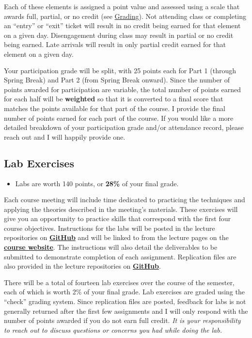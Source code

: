 \documentclass[
]{book}
\newenvironment{rmdblock}[1]
  {\begin{shaded*}
  \begin{itemize}
  \renewcommand{\labelitemi}{
    \raisebox{-.7\height}[0pt][0pt]{
      {\setkeys{Gin}{width=3em,keepaspectratio}\texttt{[image: images/\#1]}}
    }
  }
  \item
  }
  {
  \end{itemize}
  \end{shaded*}
  }
\newenvironment{rmdtip}
  {\begin{rmdblock}{tip}}
  {\end{rmdblock}}
\begin{document}
Each of these elements is assigned a point value and assessed using a scale that awards full, partial, or no credit (see \href{grading.html}{Grading}). Not attending class or completing an ``entry'' or ``exit'' ticket will result in no credit being earned for that element on a given day. Disengagement during class may result in partial or no credit being earned. Late arrivals will result in only partial credit earned for that element on a given day.

Your participation grade will be split, with 25 points each for Part 1 (through Spring Break) and Part 2 (from Spring Break onward). Since the number of points awarded for participation are variable, the total number of points earned for each half will be \textbf{weighted} so that it is converted to a final score that matches the points available for that part of the course. I provide the final number of points earned for each part of the course. If you would like a more detailed breakdown of your participation grade and/or attendance record, please reach out and I will happily provide one.

\hypertarget{lab-exercises}{%
\subsection{Lab Exercises}\label{lab-exercises}}

\begin{rmdtip}
Labs are worth 140 points, or \textbf{28\%} of your final grade.
\end{rmdtip}

Each course meeting will include time dedicated to practicing the techniques and applying the theories described in the meeting's materials. These exercises will give you an opportunity to practice skills that correspond with the first four course objectives. Instructions for the labs will be posted in the lecture repositories on \href{https://github.com/slu-soc5650}{\textbf{GitHub}} and will be linked to from the lecture pages on the \href{https://slu-soc5650.github.io/}{\textbf{course website}}. The instructions will also detail the deliverables to be submitted to demonstrate completion of each assignment. Replication files are also provided in the lecture repositories on \href{https://github.com/slu-soc5650}{\textbf{GitHub}}.

There will be a total of fourteen lab exercises over the course of the semester, each of which is worth 2\% of your final grade. Lab exercises are graded using the ``check'' grading system. Since replication files are posted, feedback for labs is not generally returned after the first few assignments and I will only respond with the number of points awarded if you do not earn full credit. \emph{It is your responsibility to reach out to discuss questions or concerns you had while doing the lab.}
\end{document}
